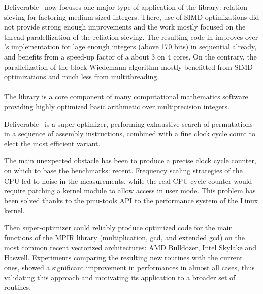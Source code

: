 \documentclass{deliverablereport}
\begin{document}
  Deliverable~ now focuses one major type of
  application of the library: relation sieving for factoring medium sized
  integers. There, use of SIMD optimizations did not provide strong enough
  improvements and the work mostly focused on the thread paralellization of the
  reliation sieving. The resulting code in \FLINT improves over \Pari's
  implementation for lage enough integers (above 170 bits) in sequential already, and benefits
  from a speed-up factor of a about 3 on 4 cores. On the contrary, the
  parallelization of the block Wiedemann algorithm mostly benefitted from SIMD
  optimizations and much less from multithreading.

  \paragraph{}

  The \MPIR library is  a core component of many computational mathematics
  software providing highly optimized  basic arithmetic over multiprecision
  integers.
  
  Deliverable~ is a super-optimizer, performing
  exhaustive search of permutations in a sequence of assembly instructions,
  combined with a fine clock cycle count to elect the most efficient variant.

  The main unexpected obstacle has been to produce a precise clock cycle
  counter, on which to base the benchmarks: recent. Frequency scaling strategies
  of the CPU led to noise in the  measurements, while the real CPU cycle counter
  would require patching a kernel module to allow access in user mode.
  This problem has been solved thanks to the pmu-tools API to the  performance system of the
  Linux kernel.

  Then super-optimizer could reliably produce optimized code for
  the main functions of the MPIR library (multiplication, gcd, and extended gcd)
  on the most common recent vectorized architectures: AMD Bulldozer, Intel
  Skylake and Haswell. Experiments comparing the resulting new routines with the
  current ones, showed a significant improvement in performances in almost all
  cases, thus validating this approach and motivating its application to a
  broader set of routines.

  \paragraph{}
\end{document}
